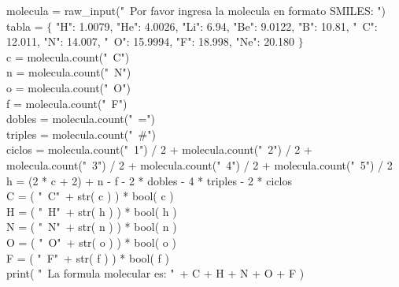\documentclass[10pt,letterpaper]{article}
\newenvironment{Code}
{
\begin{lrbox}{\selvestebox}%
\begin{minipage}{\dimexpr\columnwidth-2\fboxsep\relax}
\fontfamily{\ttdefault}\selectfont
}
{\end{minipage}\end{lrbox}%
\begin{center}
\colorbox{light-gray}{\usebox{\selvestebox}}
\end{center}
}
\begin{document}
\begin{Code}
molecula = raw\_input("\ \hspace{-2mm}Por favor ingresa la molecula en formato SMILES: ")\\
tabla = $\lbrace$ "H": 1.0079, "He": 4.0026, "Li": 6.94, "Be": 9.0122, "B": 10.81, "\ \hspace{-2mm}C": 12.011, "N": 14.007, "\ \hspace{-2mm}O": 15.9994, "F": 18.998, "Ne": 20.180 $\rbrace$\\
c = molecula.count("\ \hspace{-2mm}C")\\
n = molecula.count("\ \hspace{-2mm}N")\\
o = molecula.count("\ \hspace{-2mm}O")\\
f = molecula.count("\ \hspace{-2mm}F")\\
dobles = molecula.count("\ \hspace{-2mm}=")\\
triples = molecula.count("\ \hspace{-2mm}\#")\\
ciclos = molecula.count("\ \hspace{-2mm}1") / 2 + molecula.count("\ \hspace{-2mm}2") / 2 + molecula.count("\ \hspace{-2mm}3") / 2 + molecula.count("\ \hspace{-2mm}4") / 2 + molecula.count("\ \hspace{-2mm}5") / 2\\
h = (2 * c + 2) + n - f - 2 * dobles - 4 * triples - 2 * ciclos\\
C = ( "\ \hspace{-2mm}C"\ + str( c ) ) * bool( c )\\
H = ( "\ \hspace{-2mm}H"\ + str( h ) ) * bool( h )\\
N = ( "\ \hspace{-2mm}N"\ + str( n ) ) * bool( n )\\
O = ( "\ \hspace{-2mm}O"\ + str( o ) ) * bool( o )\\
F = ( "\ \hspace{-2mm}F"\ + str( f ) ) * bool( f )\\
print( "\ \hspace{-2mm}La formula molecular es: "\ + C + H + N + O + F )\\

\end{Code}
\end{document}
